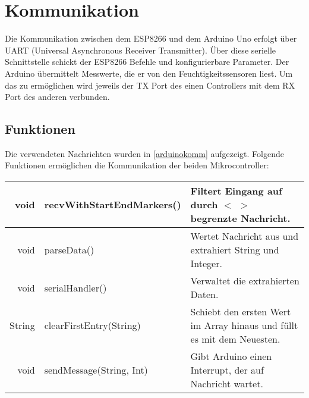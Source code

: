 \section{Kommunikation}
Die Kommunikation zwischen dem ESP8266 und dem Arduino Uno erfolgt über UART (Universal Asynchronous Receiver Transmitter).
Über diese serielle Schnittstelle schickt der ESP8266 Befehle und konfigurierbare Parameter.
Der Arduino übermittelt Messwerte, die er von den Feuchtigkeitssensoren liest.
Um das zu ermöglichen wird jeweils der TX Port des einen Controllers mit dem RX Port des anderen verbunden.

\subsection{Funktionen}
Die verwendeten Nachrichten wurden in \ref{arduinokomm} aufgezeigt.
Folgende Funktionen ermöglichen die Kommunikation der beiden Mikrocontroller:
\newline



\begin{tabular}{|rl|p{5.5cm}|}
    \hline
    void & recvWithStartEndMarkers() & Filtert Eingang auf durch $<$ $>$ begrenzte Nachricht.\\\hline
    void & parseData() & Wertet Nachricht aus und extrahiert String und Integer.\\\hline
    void & serialHandler() & Verwaltet die extrahierten Daten.\\\hline
    String & clearFirstEntry(String) & Schiebt den ersten Wert im Array hinaus und füllt es mit dem Neuesten.\\\hline
    void & sendMessage(String, Int) & Gibt Arduino einen Interrupt, der auf Nachricht wartet.\\\hline
\end{tabular}

